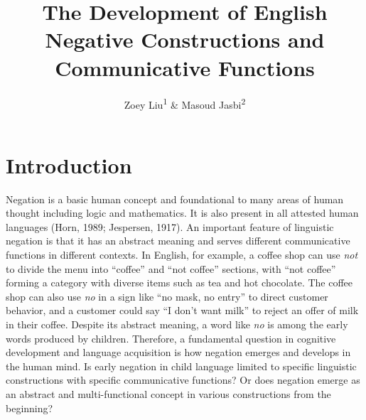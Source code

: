 \documentclass[
  man,floatsintext]{apa6}
\title{The Development of English Negative Constructions and Communicative Functions}
\author{Zoey Liu\textsuperscript{1} \& Masoud Jasbi\textsuperscript{2}}
\date{}
\affiliation{\vspace{0.5cm}\textsuperscript{1} University of Florida\\\textsuperscript{2} Uinversity of California, Davis}
\begin{document}
\maketitle

\hypertarget{introduction}{%
\section{Introduction}\label{introduction}}

Negation is a basic human concept and foundational to many areas of human thought including logic and mathematics. It is also present in all attested human languages (Horn, 1989; Jespersen, 1917). An important feature of linguistic negation is that it has an abstract meaning and serves different communicative functions in different contexts. In English, for example, a coffee shop can use \emph{not} to divide the menu into ``coffee'' and ``not coffee'' sections, with ``not coffee'' forming a category with diverse items such as tea and hot chocolate. The coffee shop can also use \emph{no} in a sign like ``no mask, no entry'' to direct customer behavior, and a customer could say ``I don't want milk'' to reject an offer of milk in their coffee. Despite its abstract meaning, a word like \emph{no} is among the early words produced by children. Therefore, a fundamental question in cognitive development and language acquisition is how negation emerges and develops in the human mind. Is early negation in child language limited to specific linguistic constructions with specific communicative functions? Or does negation emerge as an abstract and multi-functional concept in various constructions from the beginning?
\end{document}
